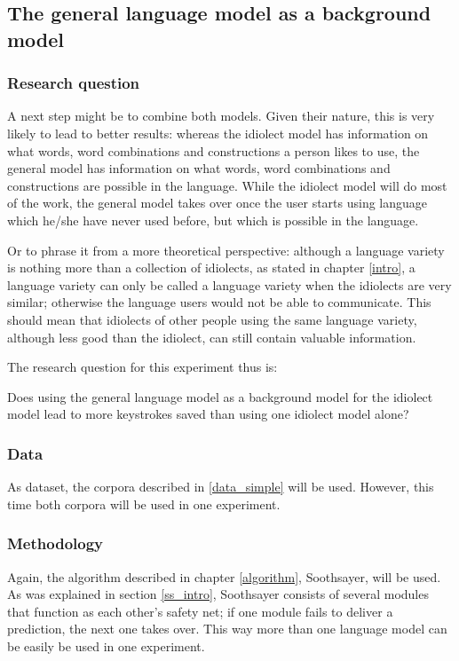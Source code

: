 \documentclass[12pt]{article}
\begin{document}
\subsection{The general language model as a background model} \label{background}

\subsubsection{Research question}

A next step might be to combine both models. Given their nature, this is very likely to lead to better results: whereas the idiolect model has information on what words, word combinations and constructions a person likes to use, the general model has information on what words, word combinations and constructions are possible in the language. While the idiolect model will do most of the work, the general model takes over once the user starts using language which he/she have never used before, but which is possible in the language. 

Or to phrase it from a more theoretical perspective: although a language variety is nothing more than a collection of idiolects, as stated in chapter \ref{intro}, a language variety can only be called a language variety when the idiolects are very similar; otherwise the language users would not be able to communicate. This should mean that idiolects of other people using the same language variety, although less good than the idiolect, can still contain valuable information.

The research question for this experiment thus is:

\begin{examples}

\item Does using the general language model as a background model for the idiolect model lead to more keystrokes saved than using one idiolect model alone?

\end{examples}

\subsubsection{Data}
As dataset, the corpora described in \ref{data_simple} will be used. However, this time  both corpora will be used in one experiment.

\subsubsection{Methodology}
Again, the algorithm described in chapter \ref{algorithm}, Soothsayer, will be used. As was explained in section \ref{ss_intro}, Soothsayer consists of several modules that function as each other's safety net; if one module fails to deliver a prediction, the next one takes over. This way more than one language model can be easily be used in one experiment.
\end{document}
